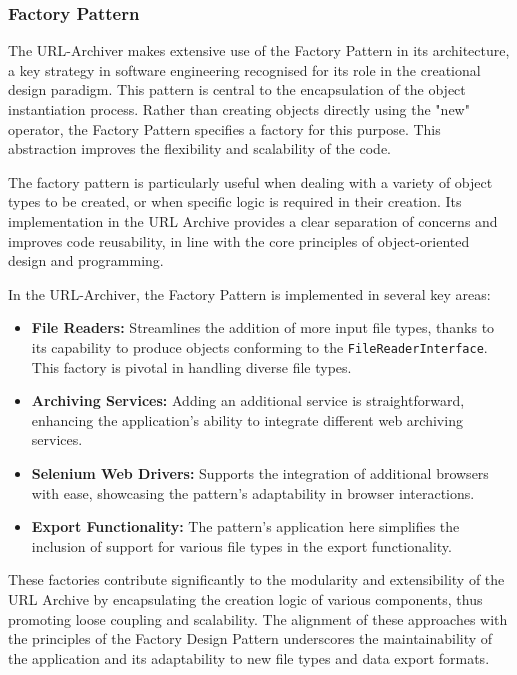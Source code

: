 \subsubsection{Factory Pattern}
The URL-Archiver makes extensive use of the Factory Pattern  in its architecture, a key strategy in software engineering recognised for its role in the creational design paradigm. This pattern is central to the encapsulation of the object instantiation process. Rather than creating objects directly using the "new" operator, the Factory Pattern  specifies a factory for this purpose. This abstraction improves the flexibility and scalability of the code.

The factory pattern is particularly useful when dealing with a variety of object types to be created, or when specific logic is required in their creation. Its implementation in the URL Archive provides a clear separation of concerns and improves code reusability, in line with the core principles of object-oriented design and programming.

In the URL-Archiver, the Factory Pattern  is implemented in several key areas:

\begin{itemize}
	\item \textbf{File Readers:} Streamlines the addition of more input file types, thanks to its capability to produce objects conforming to the \texttt{FileReaderInterface}. This factory is pivotal in handling diverse file types.
	\item \textbf{Archiving Services:} Adding an additional service is straightforward, enhancing the application's ability to integrate different web archiving services.
	\item \textbf{Selenium Web Drivers:} Supports the integration of additional browsers with ease, showcasing the pattern’s adaptability in browser interactions.
	\item \textbf{Export Functionality:} The pattern's application here simplifies the inclusion of support for various file types in the export functionality.
\end{itemize}

These factories contribute significantly to the modularity and extensibility of the URL Archive by encapsulating the creation logic of various components, thus promoting loose coupling and scalability. The alignment of these approaches with the principles of the Factory Design Pattern underscores the maintainability of the application and its adaptability to new file types and data export formats.

